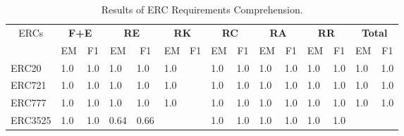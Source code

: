 \begin{table}[] \scriptsize
\setlength{\tabcolsep}{3pt} 
\caption{Results of ERC Requirements Comprehension.}\label{compre}
    \begin{tabular}{|l|ll|ll|ll|ll|ll|ll|ll|}
    \hline
    \multicolumn{1}{|c|}{\multirow{2}{*}{ERCs}} & \multicolumn{2}{c|}{\textbf{F+E}}                 & \multicolumn{2}{c|}{\textbf{RE}}                  & \multicolumn{2}{c|}{\textbf{RK}}                  & \multicolumn{2}{c|}{\textbf{RC}}                  & \multicolumn{2}{c|}{\textbf{RA}}                  & \multicolumn{2}{c|}{\textbf{RR}}                  & \multicolumn{2}{c|}{\textbf{Total}}               \\ \cline{2-15} 
    \multicolumn{1}{|c|}{}                      & \multicolumn{1}{c|}{EM} & \multicolumn{1}{c|}{F1} & \multicolumn{1}{c|}{EM} & \multicolumn{1}{c|}{F1} & \multicolumn{1}{c|}{EM} & \multicolumn{1}{c|}{F1} & \multicolumn{1}{c|}{EM} & \multicolumn{1}{c|}{F1} & \multicolumn{1}{c|}{EM} & \multicolumn{1}{c|}{F1} & \multicolumn{1}{c|}{EM} & \multicolumn{1}{c|}{F1} & \multicolumn{1}{c|}{EM} & \multicolumn{1}{c|}{F1} \\ \hline
    ERC20                                       & \multicolumn{1}{l|}{1.0}   &  1.0                 & \multicolumn{1}{l|}{1.0}   & 1.0                  & \multicolumn{1}{l|}{1.0}   &                      & \multicolumn{1}{l|}{1.0}   & 1.0                  & \multicolumn{1}{l|}{1.0}   & 1.0                  & \multicolumn{1}{l|}{1.0}   & 1.0                  & \multicolumn{1}{l|}{1.0}   & 1.0                        \\ \hline
    ERC721                                      & \multicolumn{1}{l|}{1.0}   &  1.0                 & \multicolumn{1}{l|}{1.0}   & 1.0                  & \multicolumn{1}{l|}{1.0}   &                      & \multicolumn{1}{l|}{1.0}   &  1.0                 & \multicolumn{1}{l|}{1.0}   & 1.0                  & \multicolumn{1}{l|}{1.0}   &  1.0                 & \multicolumn{1}{l|}{1.0}   &  1.0                       \\ \hline
    ERC777                                      & \multicolumn{1}{l|}{1.0}   &  1.0                 & \multicolumn{1}{l|}{1.0}   & 1.0                  & \multicolumn{1}{l|}{1.0}   &                      & \multicolumn{1}{l|}{1.0}   &  1.0                 & \multicolumn{1}{l|}{1.0}   & 1.0                  & \multicolumn{1}{l|}{1.0}   & 1.0                  & \multicolumn{1}{l|}{1.0}   &  1.0                       \\ \hline
    ERC3525                                     & \multicolumn{1}{l|}{1.0}   & 1.0                & \multicolumn{1}{l|}{0.64}  & 0.66                 & \multicolumn{1}{l|}{}   &                         & \multicolumn{1}{l|}{1.0}   &  1.0                 & \multicolumn{1}{l|}{1.0}   &  1.0                 & \multicolumn{1}{l|}{1.0}   & 1.0                  & \multicolumn{1}{l|}{}   &                         \\ \hline

\end{tabular}
\end{table}
